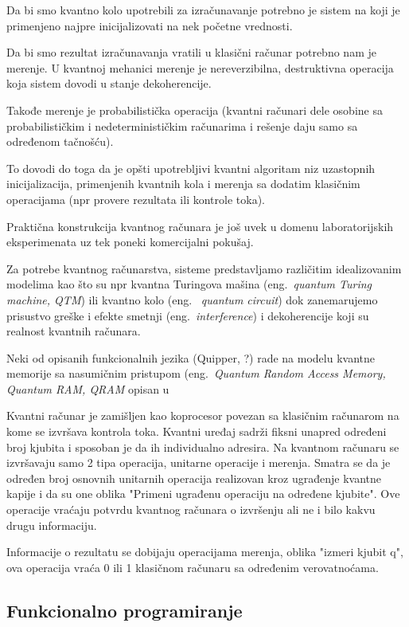 \documentclass[a4paper]{article}
\begin{document}
{Da bi smo kvantno kolo upotrebili za izračunavanje potrebno je sistem na koji je primenjeno najpre inicijalizovati na nek početne vrednosti.

Da bi smo rezultat izračunavanja vratili u klasični računar potrebno nam je merenje. U kvantnoj mehanici merenje je nereverzibilna, destruktivna operacija koja sistem dovodi u stanje dekoherencije.

Takođe merenje je probabilistička operacija (kvantni računari dele osobine sa probabilističkim i nedeterminističkim računarima i rešenje daju samo sa određenom tačnošću).

To dovodi do toga da je opšti upotrebljivi kvantni algoritam niz uzastopnih inicijalizacija, primenjenih kvantnih kola i merenja sa dodatim klasičnim operacijama (npr provere rezultata ili kontrole toka).

Praktična konstrukcija kvantnog računara je još uvek u domenu laboratorijskih eksperimenata uz tek poneki komercijalni pokušaj.

Za potrebe kvantnog računarstva, sisteme predstavljamo različitim idealizovanim modelima kao što su npr kvantna Turingova mašina (eng.~\emph{quantum Turing machine, QTM}) ili kvantno kolo (eng. ~\emph{quantum circuit}) dok zanemarujemo prisustvo greške i efekte smetnji (eng.~\emph{interference}) i dekoherencije koji su realnost kvantnih računara.

Neki od opisanih funkcionalnih jezika (Quipper, ?) rade na modelu kvantne memorije sa nasumičnim pristupom (eng.~\emph{Quantum Random Access Memory, Quantum RAM, QRAM} opisan u \cite{qram_model}

Kvantni računar je zamišljen kao koprocesor povezan sa klasičnim računarom na kome se izvršava kontrola toka. Kvantni uređaj sadrži fiksni unapred određeni broj kjubita i sposoban je da ih individualno adresira. Na kvantnom računaru se izvršavaju samo 2 tipa operacija, unitarne operacije i merenja.  Smatra se da je određen broj osnovnih unitarnih operacija realizovan kroz ugrađenje kvantne kapije i da su one oblika "Primeni ugrađenu operaciju na određene kjubite". Ove operacije vraćaju potvrdu kvantnog računara o izvršenju ali ne i bilo kakvu drugu informaciju.

Informacije o rezultatu se dobijaju operacijama merenja, oblika "izmeri kjubit q", ova operacija vraća 0 ili 1 klasičnom računaru sa određenim verovatnoćama.

\subsection{Funkcionalno programiranje}
\label{sec:funkcionalniprgjezici}

}
\end{document}

